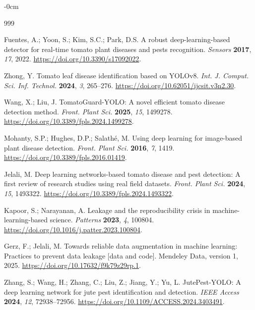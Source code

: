 \documentclass[sensors,article,submit,pdftex,moreauthors]{Definitions/mdpi}
\begin{document}
\begin{adjustwidth}{-\extralength}{0cm}
\begin{thebibliography}{999}

Fuentes, A.; Yoon, S.; Kim, S.C.; Park, D.S. A robust deep-learning-based detector for real-time tomato plant diseases and pests recognition. {\em Sensors} {\bf 2017}, {\em 17}, 2022. \url{https://doi.org/10.3390/s17092022}.

Zhong, Y. Tomato leaf disease identification based on YOLOv8. {\em Int. J. Comput. Sci. Inf. Technol.} {\bf 2024}, {\em 3}, 265--276. \url{https://doi.org/10.62051/ijcsit.v3n2.30}.

Wang, X.; Liu, J. TomatoGuard-YOLO: A novel efficient tomato disease detection method. {\em Front. Plant Sci.} {\bf 2025}, {\em 15}, 1499278. \url{https://doi.org/10.3389/fpls.2024.1499278}.

Mohanty, S.P.; Hughes, D.P.; Salath\'e, M. Using deep learning for image-based plant disease detection. {\em Front. Plant Sci.} {\bf 2016}, {\em 7}, 1419. \url{https://doi.org/10.3389/fpls.2016.01419}.

Jelali, M. Deep learning networks-based tomato disease and pest detection: A first review of research studies using real field datasets. {\em Front. Plant Sci.} {\bf 2024}, {\em 15}, 1493322. \url{https://doi.org/10.3389/fpls.2024.1493322}.

Kapoor, S.; Narayanan, A. Leakage and the reproducibility crisis in machine-learning-based science. {\em Patterns} {\bf 2023}, {\em 4}, 100804. \url{https://doi.org/10.1016/j.patter.2023.100804}.

Gerz, F.; Jelali, M. Towards reliable data augmentation in machine learning: Practices to prevent data leakage [data and code]. Mendeley Data, version 1, 2025. \url{https://doi.org/10.17632/f9k79z29rp.1}.

Zhang, S.; Wang, H.; Zhang, C.; Liu, Z.; Jiang, Y.; Yu, L. JutePest-YOLO: A deep learning network for jute pest identification and detection. {\em IEEE Access} {\bf 2024}, {\em 12}, 72938--72956. \url{https://doi.org/10.1109/ACCESS.2024.3403491}.


\end{thebibliography}
\end{adjustwidth}
\end{document}
